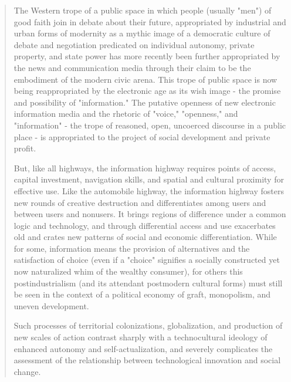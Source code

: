 \blockquote{The Western trope of a public space in which people (usually "men") of good faith join in debate about their future, appropriated by industrial and urban forms of modernity as a mythic image of a democratic culture of debate and negotiation predicated on individual autonomy, private property, and state power has more recently been further appropriated by the news and communication media through their claim to be the embodiment of the modern civic arena. This trope of public space is now being reappropriated by the electronic age as its wish image - the promise and possibility of "information." The putative openness of new electronic information media and the rhetoric of "voice," "openness," and "information" - the trope of reasoned, open, uncoerced discourse in a public place - is appropriated to the project of social development and private profit.

But, like all highways, the information highway requires points of access, capital investment, navigation skills, and spatial and cultural proximity for effective use. Like the automobile highway, the information highway fosters new rounds of creative destruction and differentiates among users and between users and nonusers. It brings regions of difference under a common logic and technology, and through differential access and use exacerbates old and crates new patterns of social and economic differentiation. While for some, information means the provision of alternatives and the satisfaction of choice (even if a "choice" signifies a socially constructed yet now naturalized whim of the wealthy consumer), for others this postindustrialism (and its attendant postmodern cultural forms) must still be seen in the context of a political economy of graft, monopolism, and uneven development.

Such processes of territorial colonizations, globalization, and production of new scales of action contrast sharply with a technocultural ideology of enhanced autonomy and self-actualization, and severely complicates the assessment of the relationship between technological innovation and social change.}

